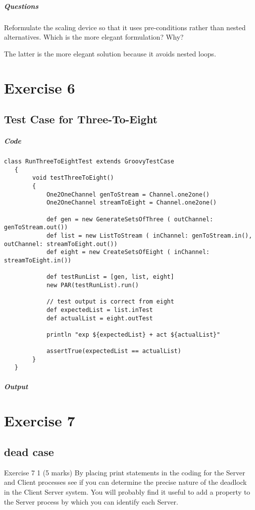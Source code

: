 \documentclass[10pt, a4paper]{article}
\begin{document}
	\subparagraph{Questions} \hfill
      Reformulate the scaling device so that it uses pre-conditions rather than nested alternatives.  Which is the more elegant formulation? Why?
   
   The latter is the more elegant solution because it avoids nested loops. 
   
   	\setcounter{section}{6}
   \section*{Exercise 6}
   
   \setcounter{subsection}{0}
   \subsection{Test Case for Three-To-Eight} \hfill
   
   \subparagraph{Code} \hfill
   
   \begin{lstlisting}[caption = "RunThreeToEightTest.groovy"]
   class RunThreeToEightTest extends GroovyTestCase
   {
   		void testThreeToEight()
   		{
   			One2OneChannel genToStream = Channel.one2one()
  	 		One2OneChannel streamToEight = Channel.one2one()
   
  			def gen = new GenerateSetsOfThree ( outChannel: genToStream.out())
   			def list = new ListToStream ( inChannel: genToStream.in(), outChannel: streamToEight.out())
   			def eight = new CreateSetsOfEight ( inChannel: streamToEight.in())
   
   			def testRunList = [gen, list, eight]
   			new PAR(testRunList).run()
   
   			// test output is correct from eight
   			def expectedList = list.inTest
   			def actualList = eight.outTest
   
   			println "exp ${expectedList} + act ${actualList}"
   
   			assertTrue(expectedList == actualList)
   		}
   }   \end{lstlisting}
   
   \subparagraph{Output}
   
   	\setcounter{section}{7}
	\section*{Exercise 7}
	
	
	\setcounter{subsection}{0}
	\subsection{dead case}
	   Exercise 7 1   (5 marks)
	By placing print statements in the coding for the Server and Client processes see if you can determine the precise nature of the deadlock in the Client Server system.  You will probably find it useful to add a property to the Server process by which you can identify each Server. 
	
\end{document}
